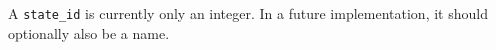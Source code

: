 A {\tt state\_id} is currently only an integer.
In a future implementation, it should optionally also be a name.